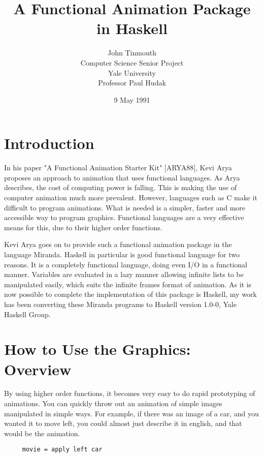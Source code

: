 

\newcommand{\X}[1]{{#1}\index{{#1}}}


\title{A Functional Animation Package in Haskell}
\author{
        John Tinmouth\\
        Computer Science Senior Project\\
         Yale University\\
         Professor Paul Hudak }
\date{9 May 1991}
\maketitle



\section{Introduction}

  	In his paper "A Functional Animation Starter Kit" [ARYA88], Kevi Arya 
proposes an approach to animation that uses functional languages. As
Arya describes, the cost of computing power is falling. This is making
the use of computer animation much more prevalent. However, languages
such as C make it difficult to program animations. What is needed is
a simpler, faster and more accessible way to program graphics. Functional
languages are a very effective means for this, due to their higher order
functions.
 
	Kevi Arya goes on to provide such a functional animation package in
the language Miranda. Haskell in particular is good functional language for
two reasons. It is a completely functional language, doing even I/O in a 
functional manner. Variables are evaluated in a lazy manner allowing infinite 
lists to be manipulated easily, which suits the infinite frames format
of animation. As it is now possible to complete the implementation of
this package is Haskell, my work has been converting these Miranda programs
to Haskell version 1.0-0, Yale Haskell Group. 


  
\section{How to Use the Graphics:  Overview}

  By using higher order functions, it becomes very easy to do rapid 
prototyping of animations. You can quickly throw out an animation of
simple images manipulated in simple ways. For example, if there was
an image of a car, and you wanted it to move left, you could almost 
just describe it in english, and that would be the animation.
\begin{verbatim}
     movie = apply left car
\end{verbatim}


